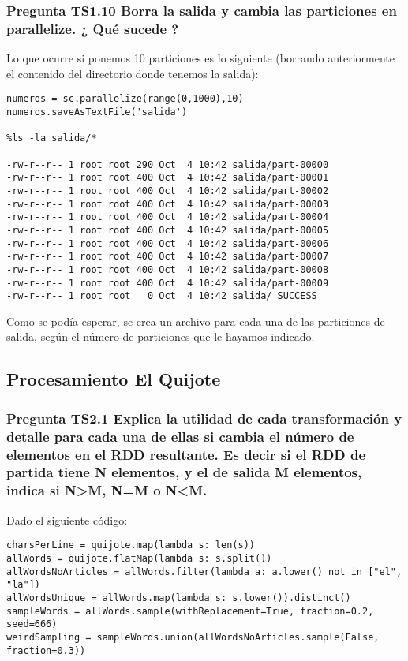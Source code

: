 \documentclass[11pt]{article}
\begin{document}
\subsubsection*{ Pregunta TS1.10 Borra la salida y cambia las particiones en parallelize. ¿ Qué sucede ?}

Lo que ocurre si ponemos 10 particiones es lo siguiente (borrando anteriormente el contenido del directorio donde tenemos la salida):

\begin{verbatim}
numeros = sc.parallelize(range(0,1000),10)
numeros.saveAsTextFile('salida')

%ls -la salida/*

-rw-r--r-- 1 root root 290 Oct  4 10:42 salida/part-00000
-rw-r--r-- 1 root root 400 Oct  4 10:42 salida/part-00001
-rw-r--r-- 1 root root 400 Oct  4 10:42 salida/part-00002
-rw-r--r-- 1 root root 400 Oct  4 10:42 salida/part-00003
-rw-r--r-- 1 root root 400 Oct  4 10:42 salida/part-00004
-rw-r--r-- 1 root root 400 Oct  4 10:42 salida/part-00005
-rw-r--r-- 1 root root 400 Oct  4 10:42 salida/part-00006
-rw-r--r-- 1 root root 400 Oct  4 10:42 salida/part-00007
-rw-r--r-- 1 root root 400 Oct  4 10:42 salida/part-00008
-rw-r--r-- 1 root root 400 Oct  4 10:42 salida/part-00009
-rw-r--r-- 1 root root   0 Oct  4 10:42 salida/_SUCCESS
\end{verbatim}

Como se podía esperar, se crea un archivo para cada una de las particiones de salida, según el número de particiones que le hayamos indicado.

\subsection{Procesamiento El Quijote}

\subsubsection*{ Pregunta TS2.1 Explica la utilidad de cada transformación y detalle para cada una de ellas si cambia el número de elementos en el RDD resultante. Es decir si el RDD de partida tiene N elementos, y el de salida M elementos, indica si N>M, N=M o N<M.}

Dado el siguiente código:

\begin{verbatim}
charsPerLine = quijote.map(lambda s: len(s))
allWords = quijote.flatMap(lambda s: s.split())
allWordsNoArticles = allWords.filter(lambda a: a.lower() not in ["el", "la"])
allWordsUnique = allWords.map(lambda s: s.lower()).distinct()
sampleWords = allWords.sample(withReplacement=True, fraction=0.2, seed=666)
weirdSampling = sampleWords.union(allWordsNoArticles.sample(False, fraction=0.3))
\end{verbatim}
\end{document}
